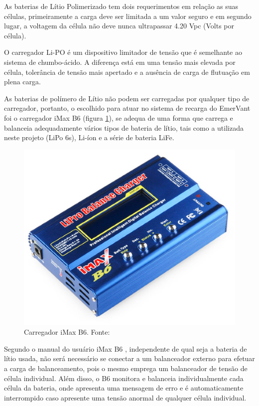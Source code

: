 As baterias de Lítio Polimerizado tem dois requerimentos em relação as suas células, primeiramente a carga deve ser limitada a um valor seguro e em segundo lugar, a voltagem da célula não deve nunca ultrapassar 4.20 Vpc (Volts por célula). \cite{gibbs}

O carregador Li-PO é um dispositivo limitador de tensão que é semelhante ao sistema de chumbo-ácido. A diferença está em uma tensão mais elevada por célula, tolerância de tensão mais apertado e a ausência de carga de flutuação em plena carga.

As baterias de polímero de Lítio não podem ser carregadas por qualquer tipo de carregador, portanto, o escolhido para atuar no sistema de recarga do EmerVant foi o carregador iMax B6 (figura \ref{fig:carregador1}), se adequa de uma forma que carrega e balanceia adequadamente vários tipos de bateria de lítio, tais como a utilizada neste projeto (LiPo 6s), Li-íon e a série de bateria LiFe.


 \begin{figure}[H]
    \centering
	\includegraphics[keepaspectratio=true,scale=0.4]{figuras/carregador1.eps}
    \caption{Carregador iMax B6. Fonte: \cite{carregador1}}
    \label{fig:carregador1}
\end{figure}


Segundo o manual do usuário iMax B6 \cite{ibmax}, independente de qual seja a bateria de lítio usada, não será necessário se conectar a um balanceador externo para efetuar a carga de balanceamento, pois o mesmo emprega um balanceador de tensão de célula individual. Além disso, o B6 monitora e balanceia individualmente cada célula da bateria, onde apresenta uma mensagem de erro e é automaticamente interrompido caso apresente uma tensão anormal de qualquer célula individual. 

